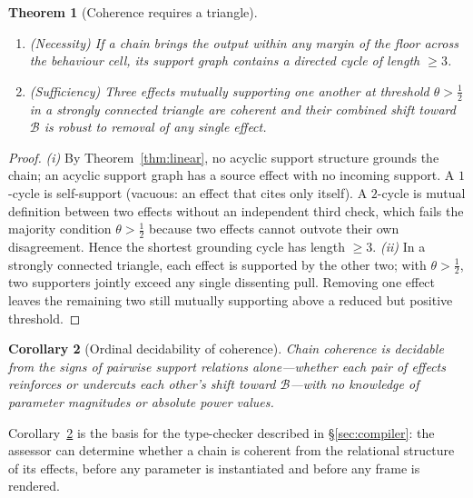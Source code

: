 \documentclass[twocolumn,11pt,a4paper]{article}
\theoremstyle{mee}
\newtheorem{theorem}{Theorem}[section]
\newtheorem{corollary}[theorem]{Corollary}
\theoremstyle{definition}
\theoremstyle{remark}
\newcommand{\BState}{\mathcal{B}}
\begin{document}
\begin{theorem}[Coherence requires a triangle]
\label{thm:triangle}
\leavevmode
\begin{enumerate}[label=(\roman*),leftmargin=1.8em,itemsep=2pt]
\item \emph{(Necessity)} If a chain brings the output within any margin
  of the floor across the behaviour cell, its support graph contains a
  directed cycle of length $\ge3$.
\item \emph{(Sufficiency)} Three effects mutually supporting one another
  at threshold $\theta>\frac{1}{2}$ in a strongly connected triangle are
  coherent and their combined shift toward $\BState$ is robust to removal
  of any single effect.
\end{enumerate}
\end{theorem}

\begin{proof}
\emph{(i)} By Theorem~\ref{thm:linear}, no acyclic support structure
grounds the chain; an acyclic support graph has a source effect with no
incoming support. A $1$-cycle is self-support (vacuous: an effect that
cites only itself). A $2$-cycle is mutual definition between two effects
without an independent third check, which fails the majority condition
$\theta>\frac{1}{2}$ because two effects cannot outvote their own
disagreement. Hence the shortest grounding cycle has length $\ge3$.
\emph{(ii)} In a strongly connected triangle, each effect is supported by
the other two; with $\theta>\frac{1}{2}$, two supporters jointly exceed
any single dissenting pull. Removing one effect leaves the remaining two
still mutually supporting above a reduced but positive threshold.
\end{proof}

\begin{corollary}[Ordinal decidability of coherence]
\label{cor:decide}
Chain coherence is decidable from the signs of pairwise support relations
alone---whether each pair of effects reinforces or undercuts each other's
shift toward $\BState$---with no knowledge of parameter magnitudes or
absolute power values.
\end{corollary}

Corollary~\ref{cor:decide} is the basis for the type-checker described in
\S\ref{sec:compiler}: the assessor can determine whether a chain is
coherent from the relational structure of its effects, before any
parameter is instantiated and before any frame is rendered.

\end{document}
